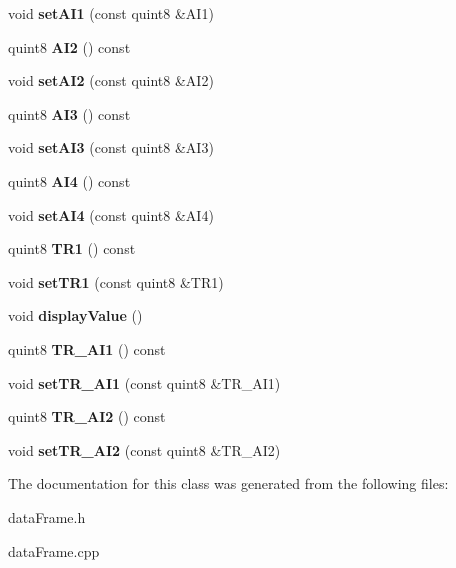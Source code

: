 \begin{DoxyCompactItemize}
\item 
\mbox{\label{class_data_frame_a580d0c833e4555bb147688c1a28568dd}} 
void {\bfseries set\+A\+I1} (const quint8 \&A\+I1)
\item 
\mbox{\label{class_data_frame_a0b5c5c36cc28249a83597ee8b3ad3715}} 
quint8 {\bfseries A\+I2} () const
\item 
\mbox{\label{class_data_frame_a673a8b5bcea8ca0dc74aa9609d6251c9}} 
void {\bfseries set\+A\+I2} (const quint8 \&A\+I2)
\item 
\mbox{\label{class_data_frame_ad818547aa1761a996aaf92308d154a59}} 
quint8 {\bfseries A\+I3} () const
\item 
\mbox{\label{class_data_frame_a86b82433a43d0739ed9c8922d84bec70}} 
void {\bfseries set\+A\+I3} (const quint8 \&A\+I3)
\item 
\mbox{\label{class_data_frame_a3ca32e99c6a8081b45fcf5c4e681a797}} 
quint8 {\bfseries A\+I4} () const
\item 
\mbox{\label{class_data_frame_a4fee88ab45e458541104a299d2ac6b98}} 
void {\bfseries set\+A\+I4} (const quint8 \&A\+I4)
\item 
\mbox{\label{class_data_frame_a7f73f817e65d9623cb941903fb636924}} 
quint8 {\bfseries T\+R1} () const
\item 
\mbox{\label{class_data_frame_a3338fbf0f2d3af6dc54a4507f51e6d1e}} 
void {\bfseries set\+T\+R1} (const quint8 \&T\+R1)
\item 
\mbox{\label{class_data_frame_aca1c57b8f8116b9da32093156870d76a}} 
void {\bfseries display\+Value} ()
\item 
\mbox{\label{class_data_frame_a672b2ba3dacf416f9bfb6bfdf2803c6e}} 
quint8 {\bfseries T\+R\+\_\+\+A\+I1} () const
\item 
\mbox{\label{class_data_frame_a7de40c1a5a071bb75845511cd64bcc99}} 
void {\bfseries set\+T\+R\+\_\+\+A\+I1} (const quint8 \&T\+R\+\_\+\+A\+I1)
\item 
\mbox{\label{class_data_frame_af45285ae18e3531cca29b4886de0b687}} 
quint8 {\bfseries T\+R\+\_\+\+A\+I2} () const
\item 
\mbox{\label{class_data_frame_a5f8ea5909cf41f6e96ec8a716e83fa65}} 
void {\bfseries set\+T\+R\+\_\+\+A\+I2} (const quint8 \&T\+R\+\_\+\+A\+I2)
\end{DoxyCompactItemize}


The documentation for this class was generated from the following files\+:\begin{DoxyCompactItemize}
\item 
data\+Frame.\+h\item 
data\+Frame.\+cpp\end{DoxyCompactItemize}
